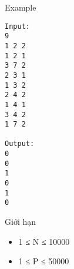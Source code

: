 Example
\begin{verbatim}
Input:
9
1 2 2 
1 2 1
3 7 2
2 3 1
1 3 2
2 4 2
1 4 1
3 4 2
1 7 2

Output:
0
0
1
0
1
0
\end{verbatim}
Giới hạn
\begin{itemize}
	\item     1 ≤ N ≤ 10000   
	\item     1 ≤ P ≤ 50000   
\end{itemize}